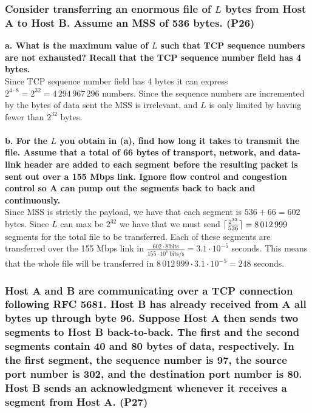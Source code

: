 \subsubsection{Consider transferring an enormous file of $L$ bytes from Host A to Host B. Assume an MSS of 536 bytes. (P26)}

\textbf{a. What is the maximum value of $L$ such that TCP sequence numbers are not exhausted? Recall that the TCP sequence number field has 4 bytes.} \\
Since TCP sequence number field has 4 bytes it can express $2^{4 \cdot 8} = 2^{32} = 4 \, 294 \, 967 \, 296$ numbers. Since the sequence numbers are incremented by the bytes of data sent the MSS is irrelevant, and $L$ is only limited by having fewer than $2^{32}$ bytes. \\
\\
\textbf{b. For the $L$ you obtain in (a), find how long it takes to transmit the file. Assume that a total of 66 bytes of transport, network, and data-link header are added to each segment before the resulting packet is sent out over a 155 Mbps link. Ignore flow control and congestion control so A can pump out the segments back to back and continuously.} 
\\
Since MSS is strictly the payload, we have that each segment is $536 + 66 = 602$ bytes. Since $L$ can max be $2^{32}$ we have that we must send $\lceil \frac{2^{32}}{536} \rceil = 8 \, 012 \,999$ segments for the total file to be transferred. Each of these segments are transferred over the 155 Mbps link in $\frac{602 \cdot 8 \, \text{bits}}{155 \cdot 10^6 \, \text{bits/s}} = 3.1 \cdot 10^{-5}$ seconds. This means that the whole file will be transferred in $8 \, 012 \, 999 \cdot 3.1 \cdot 10^{-5} = 248$ seconds.


\subsubsection{Host A and B are communicating over a TCP connection following RFC 5681. Host B has already received from A all bytes up through byte 96. Suppose Host A then sends two segments to Host B back-to-back. The first and the second segments contain 40 and 80 bytes of data, respectively. In the first segment, the sequence number is 97, the source port number is 302, and the destination port number is 80. Host B sends an acknowledgment whenever it receives a segment from Host A. (P27)}

